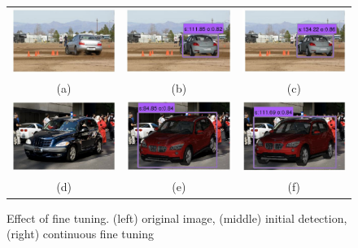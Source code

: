 \documentclass[10pt,twocolumn,letterpaper]{article}
\begin{document}
\begin{figure}[t]
 \begin{center}
    \setlength\tabcolsep{0pt}
    \begin{tabular}{ccc}
   \includegraphics[width=0.33\linewidth]{tuning/1.png} &
   \includegraphics[width=0.33\linewidth]{tuning/2.png} &
   \includegraphics[width=0.33\linewidth]{tuning/3.png} \\[-5pt]
   (a) & (b) & (c)\\
   \includegraphics[width=0.33\linewidth]{tuning/4.png} &
   \includegraphics[width=0.33\linewidth]{tuning/5.png} &
   \includegraphics[width=0.33\linewidth]{tuning/6.png} \\[-5pt]
   (d) & (e) & (f)\\
   \end{tabular}
 \end{center}
 \caption{Effect of fine tuning. (left) original image, (middle) initial detection, (right) continuous fine tuning}
 \label{fig:tuning}
\end{figure}
\end{document}
